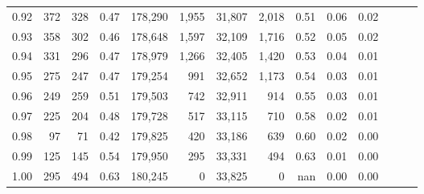 \begin{tabular}{rrrrrrrrrrrrrr}
0.92 &    372 &  328 &  0.47 &  178,290 &    1,955 &  31,807 &   2,018 &  0.51 &  0.06 &      0.02 \\
0.93 &    358 &  302 &  0.46 &  178,648 &    1,597 &  32,109 &   1,716 &  0.52 &  0.05 &      0.02 \\
0.94 &    331 &  296 &  0.47 &  178,979 &    1,266 &  32,405 &   1,420 &  0.53 &  0.04 &      0.01 \\
0.95 &    275 &  247 &  0.47 &  179,254 &      991 &  32,652 &   1,173 &  0.54 &  0.03 &      0.01 \\
0.96 &    249 &  259 &  0.51 &  179,503 &      742 &  32,911 &     914 &  0.55 &  0.03 &      0.01 \\
0.97 &    225 &  204 &  0.48 &  179,728 &      517 &  33,115 &     710 &  0.58 &  0.02 &      0.01 \\
0.98 &     97 &   71 &  0.42 &  179,825 &      420 &  33,186 &     639 &  0.60 &  0.02 &      0.00 \\
0.99 &    125 &  145 &  0.54 &  179,950 &      295 &  33,331 &     494 &  0.63 &  0.01 &      0.00 \\
1.00 &    295 &  494 &  0.63 &  180,245 &        0 &  33,825 &       0 &   nan &  0.00 &      0.00 \\
\bottomrule
\end{tabular}
